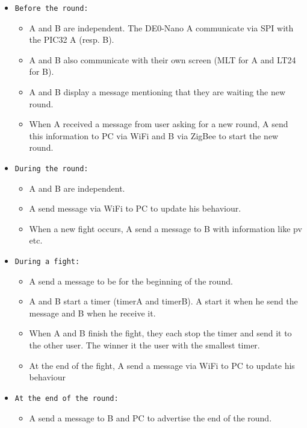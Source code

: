 \documentclass[10pt,a4paper]{article}
\begin{document}
    \begin{itemize}
        \item \texttt{Before the round:}
                \begin{itemize}
                        \item A and B are independent. The DE0-Nano A communicate via SPI with the PIC32 A (resp. B).
                        \item A and B also communicate with their own screen (MLT for A and LT24 for B).
                        \item A and B display a message mentioning that they are waiting the new round.
                        \item When A received a message from user asking for a new round, A send this information to PC via WiFi and B via ZigBee to start the new round.
                \end{itemize}
        \item \texttt{During the round:}
                \begin{itemize}
                        \item A and B are independent.
                        \item A send message via WiFi to PC to update his behaviour.
                        \item When a new fight occurs, A send a message to B with information like pv etc.
                \end{itemize}
        \item \texttt{During a fight:}
                \begin{itemize}
                        \item A send a message to be for the beginning of the round.
                        \item A and B start a timer (timerA and timerB). A start it when he send the message  and B when he receive it.
                        \item When A and B finish the fight,  they each stop the timer and send it to the other user. The winner it the user with the smallest timer.
                        \item At the end of the fight, A send a message via WiFi to PC to update his behaviour
                \end{itemize}
        \item \texttt{At the end of the round:}
                        \begin{itemize}
                        \item A send a message to B and PC to advertise the end of the round.
                        \end{itemize}
    \end{itemize}
\end{document}

